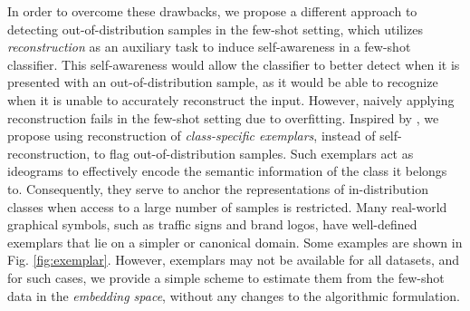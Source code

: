 
In order to overcome these drawbacks, we propose a different approach to detecting out-of-distribution samples in the few-shot setting, which utilizes \emph{reconstruction} as an auxiliary task to induce self-awareness in a few-shot classifier. This self-awareness would allow the classifier to better detect when it is presented with an out-of-distribution sample, as it would be able to recognize when it is unable to accurately reconstruct the input. However, naively applying reconstruction fails in the few-shot setting due to overfitting. Inspired by \cite{kim2019variational}, we propose using reconstruction of \textit{class-specific exemplars}, instead of self-reconstruction, to flag out-of-distribution samples. Such exemplars act as ideograms to effectively encode the semantic information of the class it belongs to. Consequently, they serve to anchor the representations of in-distribution classes when access to a large number of samples is restricted. Many real-world graphical symbols, such as traffic signs and brand logos, have well-defined exemplars that lie on a simpler or canonical domain. Some examples are shown in Fig. \ref{fig:exemplar}. However, exemplars may not be available for all datasets, and for such cases, we provide a simple scheme to estimate them from the few-shot data in the \emph{embedding space}, without any changes to the algorithmic formulation.


